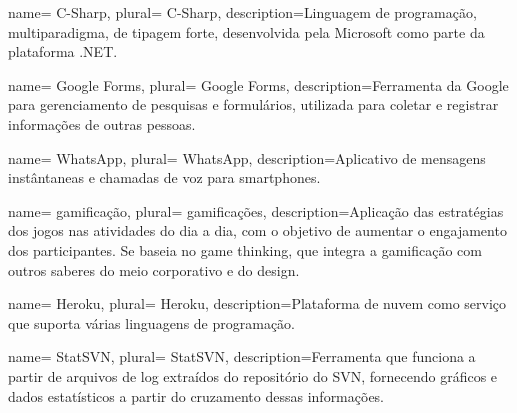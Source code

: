  {
    name= C-Sharp,
    plural= {C-Sharp},
    description={Linguagem de programação, multiparadigma, de tipagem forte, desenvolvida pela Microsoft como parte da plataforma .NET. }
}

 {
    name= Google Forms,
    plural= {Google Forms},
    description={Ferramenta da Google para gerenciamento de pesquisas e formulários, utilizada para coletar e registrar informações de outras pessoas. }
}

 {
    name= WhatsApp,
    plural= {WhatsApp},
    description={Aplicativo de mensagens instântaneas e chamadas de voz para smartphones. }
}

 {
    name= gamificação,
    plural= {gamificações},
    description={Aplicação das estratégias dos jogos nas atividades do dia a dia, com o objetivo de aumentar o engajamento dos participantes. Se baseia no game thinking, que integra a gamificação com outros saberes do meio corporativo e do design. }
}

 {
    name= Heroku,
    plural= {Heroku},
    description={Plataforma de nuvem como serviço que suporta várias linguagens de programação.}
}

 {
    name= StatSVN,
    plural= {StatSVN},
    description={Ferramenta que funciona a partir de arquivos de log extraídos do
    repositório do SVN, fornecendo gráficos e dados estatísticos a
    partir do cruzamento dessas informações.}
}





